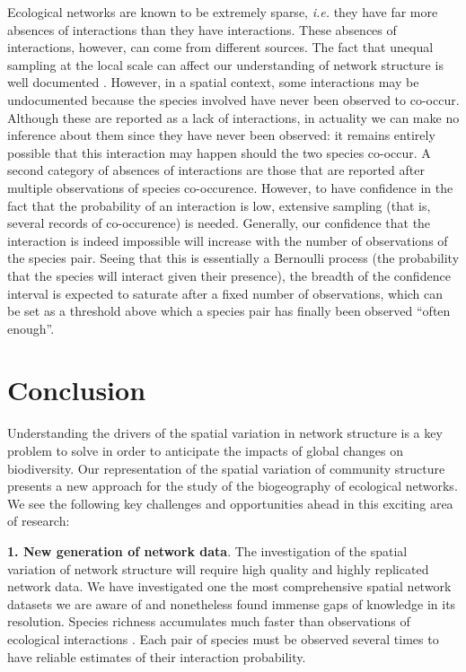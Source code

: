 \documentclass[12pt]{article}
\begin{document}
Ecological networks are known to be extremely sparse, \emph{i.e.} they have far
more absences of interactions than they have interactions. These absences of
interactions, however, can come from different sources. The fact that unequal
sampling at the local scale can affect our understanding of network structure
is well documented \citep{Martinez1999}. However, in a spatial context, some
interactions may be undocumented because the species involved have never been
observed to co-occur. Although these are reported as a lack of interactions,
in actuality we can make no inference about them since they have never been
observed: it remains entirely possible that this interaction may happen should the two
species co-occur. A second category of absences of interactions are those that
are reported after multiple observations of species co-occurence. However, to
have confidence in the fact that the probability of an interaction is
low, extensive sampling (that is, several records of co-occurence) is needed. Generally,
our confidence that the interaction is indeed impossible will increase with
the number of observations of the species pair. Seeing that this is essentially
a Bernoulli process (the probability that the species will interact given
their presence), the breadth of the confidence interval is expected to
saturate after a fixed number of observations, which can be set as a threshold
above which a species pair has finally been observed ``often enough''.

\section*{Conclusion}

Understanding the drivers of the spatial variation in network structure is a
key problem to solve in order to anticipate the impacts of global changes on
biodiversity. Our representation of the spatial variation of community
structure presents a new approach for the study of the biogeography of ecological
networks. We see the following key challenges and opportunities ahead in this
exciting area of research:

\textbf{1. New generation of network data}. The investigation of the spatial
variation of network structure will require high quality and highly replicated
network data. We have investigated one the most comprehensive spatial network
datasets we are aware of and nonetheless found immense gaps of knowledge in its
resolution. Species richness accumulates much faster than observations of
ecological interactions \citep{Poisot2012}. Each pair of species must be
observed several times to have reliable estimates of their interaction
probability.
\end{document}
